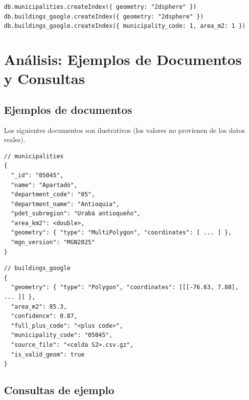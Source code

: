 \documentclass[11pt,letterpaper]{article}
\newenvironment{codebox}{\par\noindent\begin{minipage}{\linewidth}}{\end{minipage}\par}
\begin{document}
\begin{codebox}\begin{lstlisting}[style=lab,language=mongosh]
db.municipalities.createIndex({ geometry: "2dsphere" })
db.buildings_google.createIndex({ geometry: "2dsphere" })
db.buildings_google.createIndex({ municipality_code: 1, area_m2: 1 })
\end{lstlisting}\end{codebox}

\section{Análisis: Ejemplos de Documentos y Consultas}

\subsection{Ejemplos de documentos}

Los siguientes documentos son ilustrativos (los valores no provienen de los datos reales).

\begin{codebox}\begin{lstlisting}[style=lab,language=mongosh]
// municipalities
{
  "_id": "05045",
  "name": "Apartadó",
  "department_code": "05",
  "department_name": "Antioquia",
  "pdet_subregion": "Urabá antioqueño",
  "area_km2": <double>,
  "geometry": { "type": "MultiPolygon", "coordinates": [ ... ] },
  "mgn_version": "MGN2025"
}
\end{lstlisting}\end{codebox}

\begin{codebox}\begin{lstlisting}[style=lab,language=mongosh]
// buildings_google
{
  "geometry": { "type": "Polygon", "coordinates": [[[-76.63, 7.88], ... ]] },
  "area_m2": 85.3,
  "confidence": 0.87,
  "full_plus_code": "<plus code>",
  "municipality_code": "05045",
  "source_file": "<celda S2>.csv.gz",
  "is_valid_geom": true
}
\end{lstlisting}\end{codebox}

\subsection{Consultas de ejemplo}
\end{document}
